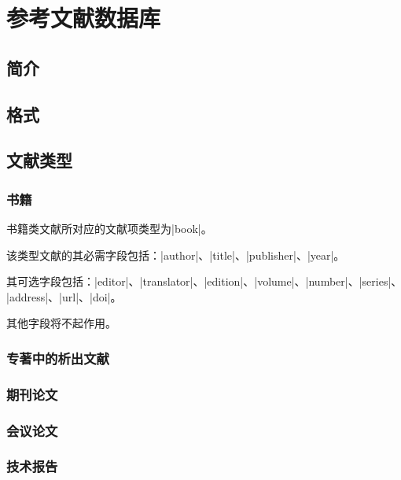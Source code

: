 \chapter{参考文献数据库}\label{chap:bib}

\section{简介}\label{sec:bib-intro}


\section{格式}\label{sec:bib-format}

\section{文献类型}\label{sec:bib-type}

\subsection{书籍}

书籍类文献所对应的{\BibTeX}文献项类型为|book|。

该类型文献的其必需字段包括：|author|、|title|、|publisher|、|year|。

其可选字段包括：|editor|、|translator|、|edition|、|volume|、|number|、|series|、
|address|、|url|、|doi|。

其他字段将不起作用。

\subsection{专著中的析出文献}

\subsection{期刊论文}

\subsection{会议论文}

\subsection{技术报告}

